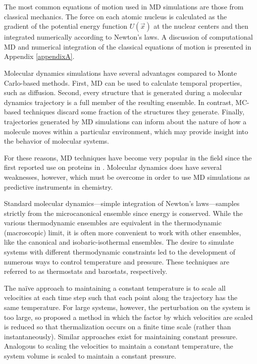 The most common equations of motion used in MD simulations are those from
classical mechanics. The force on each atomic nucleus is calculated as the
gradient of the potential energy function $U(\vec{x})$ at the nuclear centers
and then integrated numerically according to Newton's laws. A discussion of
computational MD and numerical integration of the classical equations of motion
is presented in Appendix \ref{appendixA}.

Molecular dynamics simulations have several advantages compared to Monte
Carlo-based methods. First, MD can be used to calculate temporal properties,
such as diffusion. Second, every structure that is generated during a molecular
dynamics trajectory is a full member of the resulting ensemble. In contrast,
MC-based techniques discard some fraction of the structures they generate.
Finally, trajectories generated by MD simulations can inform about the nature of
how a molecule moves within a particular environment, which may provide insight
into the behavior of molecular systems.

For these reasons, MD techniques have become very popular in the field since the
first reported use on proteins in \citeyear{McCammon_Nature_1977_v267_p585}.
\cite{McCammon_Nature_1977_v267_p585} Molecular dynamics does have several
weaknesses, however, which must be overcome in order to use MD simulations as
predictive instruments in chemistry.

Standard molecular dynamics---simple integration of Newton's laws---samples
strictly from the microcanonical ensemble since energy is conserved. While the
various thermodynamic ensembles are equivalent in the thermodynamic
(macroscopic) limit, it is often more convenient to work with other ensembles,
like the canonical and isobaric-isothermal ensembles. The desire to simulate
systems with different thermodynamic constraints led to the development of
numerous ways to control temperature and pressure.
\cite{Leach_Book_MolModel_2001} These techniques are referred to as thermostats
and barostats, respectively.

The na\"ive approach to maintaining a constant temperature is to scale all
velocities at each time step such that each point along the trajectory has the
same temperature. \cite{Woodcock1971} For large systems, however, the
perturbation on the system is too large, so
\citeauthor{Berendsen_JChemPhys_1984_v81_p3684} proposed a method in which the
factor by which velocities are scaled is reduced so that thermalization occurs
on a finite time scale (rather than instantaneously).
\cite{Berendsen_JChemPhys_1984_v81_p3684} Similar approaches exist for
maintaining constant pressure. \cite{Berendsen_JChemPhys_1984_v81_p3684}
Analogous to scaling the velocities to maintain a constant temperature, the
system volume is scaled to maintain a constant pressure.

